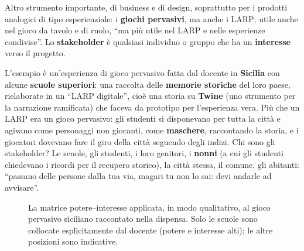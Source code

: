 

Altro strumento importante, di business e di design, soprattutto per i prodotti
analogici di tipo esperienziale: i \textbf{giochi pervasivi}, ma anche i LARP; utile anche
nel gioco da tavolo e di ruolo, ``ma più utile nel LARP e nelle esperienze condivise''.
Lo \textbf{stakeholder} è qualsiasi individuo o gruppo che ha un \textbf{interesse} verso
il progetto.

L'esempio è un'esperienza di gioco pervasivo fatta dal docente in \textbf{Sicilia} con
alcune \textbf{scuole superiori}: una raccolta delle \textbf{memorie storiche} del loro
paese, rielaborate in un ``LARP digitale'', cioè una storia su \textbf{Twine} (uno
strumento per la narrazione ramificata) che faceva da prototipo per l'esperienza vera.
Più che un LARP era un gioco pervasivo: gli studenti si disponevano per tutta la città e
agivano come personaggi non giocanti, come \textbf{maschere}, raccontando la storia, e i
giocatori dovevano fare il giro della città seguendo degli indizi. Chi sono gli
stakeholder? Le scuole, gli studenti, i loro genitori, i \textbf{nonni} (a cui gli
studenti chiedevano i ricordi per il recupero storico), la città stessa, il comune, gli
abitanti: ``passano delle persone dalla tua via, magari tu non lo sai: devi andarle ad
avvisare''.

\begin{figure}[htbp]
\centering
{}
\caption{La matrice potere--interesse applicata, in modo qualitativo, al gioco pervasivo
siciliano raccontato nella dispensa. Solo le scuole sono collocate esplicitamente dal
docente (potere e interesse alti); le altre posizioni sono indicative.}
\label{a5:fig:stakeholder}
\end{figure}

